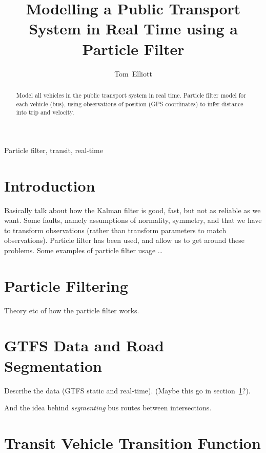 \documentclass[draft,a4paper,onecolumn]{IEEEtran}\usepackage[]{graphicx}\usepackage[]{color}
\title{Modelling a Public Transport System in Real Time using a Particle Filter}
\author{Tom~Elliott}
\begin{document}
\maketitle


\begin{abstract}
  Model all vehicles in the public transport system in real time.
  Particle filter model for each vehicle (bus),
  using observations of position (GPS coordinates) to infer distance into trip
  and velocity.
\end{abstract}

\begin{IEEEkeywords}
  Particle filter, transit, real-time
\end{IEEEkeywords}


\section{Introduction}
\label{sec:intro}


Basically talk about how the Kalman filter is good, fast, but not as reliable as we want.
Some faults, namely assumptions of normality, symmetry, and that we have to transform observations
(rather than transform parameters to match observations).
Particle filter has been used, and allow us to get around these problems.
Some examples of particle filter usage \ldots




\section{Particle Filtering}
\label{sec:pf}


Theory etc of how the particle filter works.




\section{GTFS Data and Road Segmentation}
\label{sec:gtfs}

Describe the data (GTFS static and real-time). (Maybe this go in section~\ref{sec:intro}?).

And the idea behind \emph{segmenting} bus routes between intersections.



\section{Transit Vehicle Transition Function}
\label{sec:transition}
\end{document}
